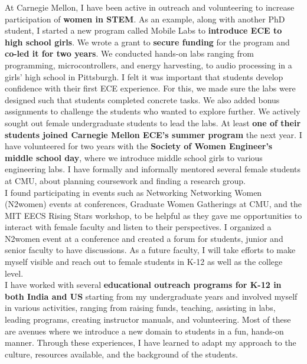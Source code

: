 \documentclass[10pt]{article}
\begin{document}
At Carnegie Mellon, I have been active in outreach and volunteering to increase participation of \textbf{women in STEM}. %
As an example, along with another PhD student, I started a new program called Mobile Labs to \textbf{introduce ECE to high school girls}. We wrote a grant to \textbf{secure funding} for the program and \textbf{co-led it for two years}. We conducted hands-on labs ranging from programming, microcontrollers, and energy harvesting, to audio processing in a girls' high school in Pittsburgh. I felt it was important that students develop confidence with their first ECE experience. For this, we made sure the labs were designed such that students completed concrete tasks. We also added bonus assignments to challenge the students who wanted to explore further. We actively sought out female undergraduate students to lead the labs. At least \textbf{one of their students joined Carnegie Mellon ECE's summer program} the next year. I have volunteered for two years with the \textbf{Society of Women Engineer's middle school day}, where we introduce middle school girls to various engineering labs. I have formally and informally mentored several female students at CMU, about planning coursework and finding a research group.\\ %

I found participating in events such as Networking Networking Women (N2women) events at conferences, Graduate Women Gatherings at CMU, and the MIT EECS Rising Stars workshop, to be helpful as they gave me opportunities to interact with female faculty and listen to their perspectives. I organized a N2women event at a conference and created a forum for students, junior and senior faculty to have discussions. As a future faculty, I will take efforts to make myself visible and reach out to female students in K-12 as well as the college level. \\

I have worked with several \textbf{educational outreach programs for K-12 in both India and US} starting from my undergraduate years and involved myself in various activities, ranging from raising funds, teaching, assisting in labs, leading programs, creating instructor manuals, and volunteering. Most of these are avenues where we introduce a new domain to students in a fun, hands-on manner. Through these experiences, I have learned to adapt my approach to the culture, resources available, and the background of the students. \\
\end{document}
